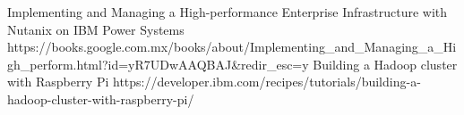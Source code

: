 %
%
%


\begin{publications}
    \publication
        {Implementing and Managing a High-performance Enterprise Infrastructure with Nutanix on IBM Power Systems}
        {https://books.google.com.mx/books/about/Implementing_and_Managing_a_High_perform.html?id=yR7UDwAAQBAJ&redir_esc=y}
    \publication
        {Building a Hadoop cluster with Raspberry Pi}
        {https://developer.ibm.com/recipes/tutorials/building-a-hadoop-cluster-with-raspberry-pi/}
\end{publications}